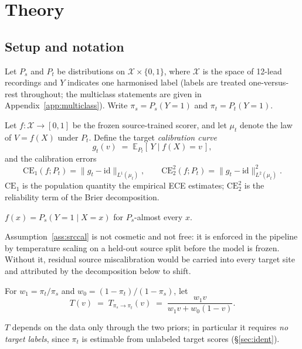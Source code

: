 \section{Theory}
\label{sec:theory}

\subsection{Setup and notation}

Let $P_s$ and $P_t$ be distributions on $\mathcal{X}\times\{0,1\}$, where
$\mathcal{X}$ is the space of 12-lead recordings and $Y$ indicates one
harmonised label (labels are treated one-versus-rest throughout; the multiclass
statements are given in Appendix~\ref{app:multiclass}).  Write
$\pi_s=P_s(Y=1)$ and $\pi_t=P_t(Y=1)$.

Let $f:\mathcal{X}\to[0,1]$ be the frozen source-trained scorer, and let
$\mu_t$ denote the law of $V=f(X)$ under $P_t$.  Define the target
\emph{calibration curve}
\[
  g_t(v)\;=\;\mathbb{E}_{P_t}\!\left[\,Y \mid f(X)=v\,\right],
\]
and the calibration errors
\[
  \mathrm{CE}_1(f;P_t)=\big\|g_t-\mathrm{id}\big\|_{L^1(\mu_t)},
  \qquad
  \mathrm{CE}_2^2(f;P_t)=\big\|g_t-\mathrm{id}\big\|^2_{L^2(\mu_t)} .
\]
$\mathrm{CE}_1$ is the population quantity the empirical ECE estimates;
$\mathrm{CE}_2^2$ is the reliability term of the Brier decomposition.

\begin{assumption}\label{ass:srccal}
$f(x)=P_s(Y=1\mid X=x)$ for $P_s$-almost every $x$.
\end{assumption}

Assumption~\ref{ass:srccal} is not cosmetic and not free: it is enforced in the
pipeline by temperature scaling on a held-out source split before the model is
frozen.  Without it, residual source miscalibration would be carried into every
target site and attributed by the decomposition below to shift.

\begin{definition}\label{def:T}
For $w_1=\pi_t/\pi_s$ and $w_0=(1-\pi_t)/(1-\pi_s)$, let
\[
  T(v)\;=\;T_{\pi_s\to\pi_t}(v)\;=\;\frac{w_1 v}{w_1 v + w_0 (1-v)} .
\]
\end{definition}

$T$ depends on the data only through the two priors; in particular it requires
\emph{no target labels}, since $\pi_t$ is estimable from unlabeled target
scores (\S\ref{sec:ident}).

